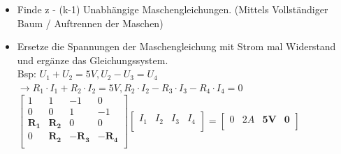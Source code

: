 \begin{center}
\begin{itemize}
					                \item Finde z - (k-1) Unabhängige Maschengleichungen. (Mittels Vollständiger Baum / Auftrennen der Maschen)
					                \item Ersetze die Spannungen der Maschengleichung mit Strom mal Widerstand und ergänze das Gleichungssystem.
					                \\ Bsp:
					                $U_1 + U_2 = 5V, U_2 - U_3 = U_4$ \\ $ \rightarrow R_1 \cdot I_1 + R_2 \cdot I_2 = 5V, R_2 \cdot I_2 - R_3 \cdot I_3 - R_4 \cdot I_4 = 0$ \\
					                $
					 \left[ {\begin{array}{cccc}
					    1 & 1 & -1 & 0 \\
					    0 & 0 & 1 & -1 \\
					    \mathbf{R_1} & \mathbf{R_2} & 0 & 0 \\
					    0 & \mathbf{R_2} & \mathbf{-R_3} & \mathbf{-R_4} \\
					\end{array} } \right] \left[ {\begin{array}{c} I_1 & I_2 & I_3 & I_4 \\ \end{array} } \right] =   \left[ {\begin{array}{c}  0 & 2A & \mathbf{5V} & \mathbf{0} \\ \end{array} } \right] $ \\

					              \end{itemize}
					            \end{center}
					            \iend
